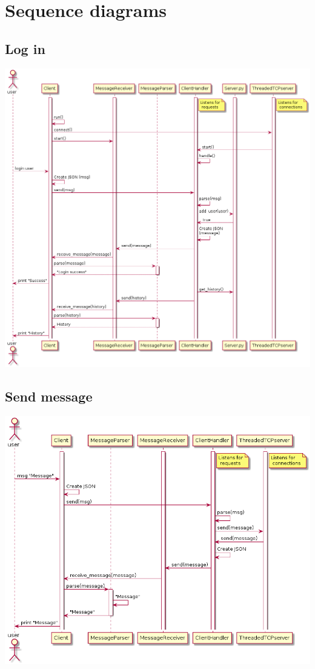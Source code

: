 \documentclass[11pt]{article}
\begin{document}
\section{Sequence diagrams}
\label{sec-3}
\subsection{Log in}
\label{sec-3-1}
\includegraphics[width=.9\linewidth]{sequence_login.png}

\subsection{Send message}
\label{sec-3-2}
\includegraphics[width=.9\linewidth]{sequence_msg.png}
\end{document}
